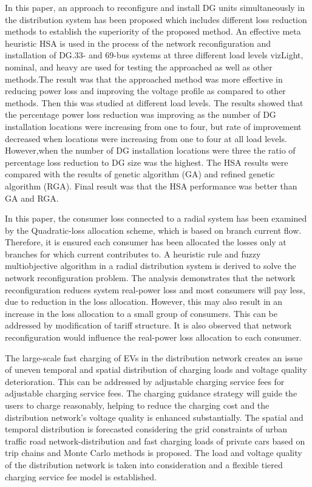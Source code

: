 	\noindent \cite{rao} In this paper, an approach to reconfigure and install DG units simultaneously in the distribution system has been proposed which includes different loss reduction methods to establish the superiority of the proposed method. An effective meta heuristic HSA is used in the process of the network reconfiguration and installation of DG.33- and 69-bus systems at three different load levels vizLight, nominal, and heavy are used for testing the approached as well as other methods.The result was that the approached method was more effective in reducing power loss and improving the voltage profile as compared to other methods. Then this  was studied at different load levels. The results showed that the percentage power loss reduction was improving as the number of DG installation locations were increasing from one to four, but rate of improvement decreased when locations were increasing from one to four at all load levels. However,when the number of DG installation locations were three the ratio of percentage loss reduction to DG size was the highest. The HSA results were compared with the results of genetic algorithm (GA) and refined genetic algorithm (RGA). Final result was that the HSA performance was better than GA and RGA.
	
	\noindent \cite{69bus} In this paper, the consumer loss connected to a radial system has been examined by the Quadratic-loss allocation scheme, which is based on branch current flow. Therefore, it is ensured each consumer has been allocated the losses only at branches for which current contributes to.  A heuristic rule and fuzzy multiobjective algorithm in a radial distribution system is derived to solve the network reconfiguration problem. The analysis demonstrates that the network reconfiguration reduces system real-power loss and most consumers will pay less, due to reduction in the loss allocation. However, this may also result in an increase in the loss allocation to a small group of consumers. This can be addressed by modification of tariff structure. It is also observed that network reconfiguration would influence the real-power loss allocation to each consumer.
	
	\noindent \cite{zhang2022fast} The large-scale fast charging of EVs in the distribution network creates an issue of uneven temporal and spatial distribution of charging loads and voltage quality deterioration.  This can be addressed by adjustable charging service fees for adjustable charging service fees. The charging guidance strategy will guide the users to charge reasonably, helping to reduce the charging cost and the distribution network’s voltage quality is enhanced substantially.
	The spatial and temporal distribution is forecasted considering the grid constraints of urban traffic road network-distribution and fast charging loads of private cars based on trip chains and Monte Carlo methods is proposed. The load and voltage quality of the distribution network is taken into consideration and a flexible tiered charging service fee model is established. 
	
